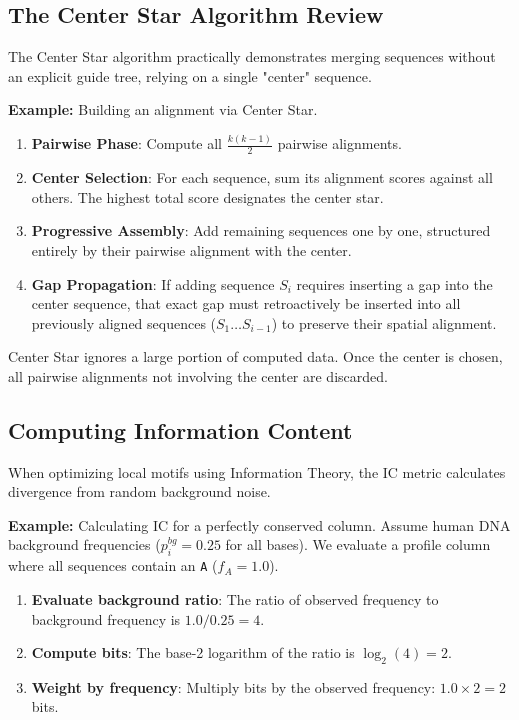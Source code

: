 \subsection{The Center Star Algorithm Review}
The Center Star algorithm practically demonstrates merging sequences without an explicit guide tree, relying on a single "center" sequence.

\textbf{Example:} Building an alignment via Center Star.
\begin{enumerate}
  \item \textbf{Pairwise Phase}: Compute all $\frac{k(k-1)}{2}$ pairwise alignments.
  \item \textbf{Center Selection}: For each sequence, sum its alignment scores against all others. The highest total score designates the center star.
  \item \textbf{Progressive Assembly}: Add remaining sequences one by one, structured entirely by their pairwise alignment with the center.
  \item \textbf{Gap Propagation}: If adding sequence $S_i$ requires inserting a gap into the center sequence, that exact gap must retroactively be inserted into all previously aligned sequences ($S_1 \dots S_{i-1}$) to preserve their spatial alignment.
\end{enumerate}
\sta Center Star ignores a large portion of computed data. Once the center is chosen, all pairwise alignments not involving the center are discarded.

\subsection{Computing Information Content}
When optimizing local motifs using Information Theory, the IC metric calculates divergence from random background noise.

\textbf{Example:} Calculating IC for a perfectly conserved column.
Assume human DNA background frequencies ($p_i^{bg} = 0.25$ for all bases). We evaluate a profile column where all sequences contain an \texttt{A} ($f_A = 1.0$).
\begin{enumerate}
  \item \textbf{Evaluate background ratio}: The ratio of observed frequency to background frequency is $1.0 / 0.25 = 4$.
  \item \textbf{Compute bits}: The base-2 logarithm of the ratio is $\log_2(4) = 2$.
  \item \textbf{Weight by frequency}: Multiply bits by the observed frequency: $1.0 \times 2 = 2$ bits.
\end{enumerate}

